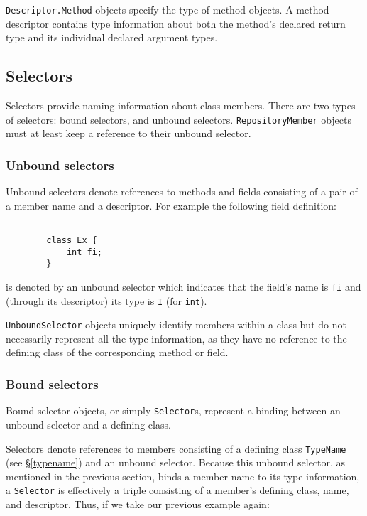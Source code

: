 \documentclass{report}
\begin{document}
\texttt{Descriptor.Meth\-od} objects specify the type of
method objects. A method descriptor contains type 
information about both the method's declared return type and its 
individual declared argument types.

\subsection{Selectors}\label{selectors}

Selectors provide naming information about class members. There are two
types of selectors: bound selectors, and unbound selectors. 
\texttt{Re\-pos\-i\-tory\-Mem\-ber} objects must at least keep a reference to
their unbound selector.

\newpage

\subsubsection{Unbound selectors}\label{unbound}

Unbound selectors denote references to methods and fields consisting of
a pair of a member name and a descriptor. For example the following field 
definition:

\begin{verbatim}

        class Ex {
            int fi;
        }

\end{verbatim}

\noindent is denoted by an unbound selector which indicates that the field's 
name is \texttt{fi} and (through its descriptor) its type is \texttt{I} (for 
\texttt{int}).

\texttt{Un\-bound\-Se\-lec\-tor} objects 
uniquely identify members within a class but do not
necessarily represent all the type information, as they have no reference
to the defining class of the corresponding method or field.

\subsubsection{Bound selectors}

Bound selector objects, or simply \texttt{Se\-lec\-tor}s, represent a binding 
between an unbound selector and a defining class.

Selectors denote references to members consisting of a
defining class \texttt{TypeName} (see \S \ref{typename}) and
an unbound selector. Because this unbound selector, as mentioned in
the previous section, binds a member name to its type information,
a \texttt{Se\-lec\-tor} is effectively a triple consisting of a
member's defining class, name, and descriptor. Thus, if we take
our previous example again:
\end{document}
